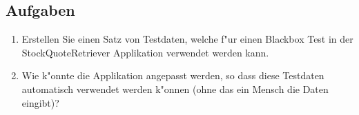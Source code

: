 \subsection{Aufgaben}
\begin{enumerate}
\item Erstellen Sie einen Satz von Testdaten, welche f"ur einen Blackbox Test in der
StockQuoteRetriever Applikation verwendet werden kann.
\item Wie k"onnte die Applikation angepasst werden, so dass diese Testdaten
automatisch verwendet werden k"onnen (ohne das ein Mensch die Daten eingibt)?
\end{enumerate}
\newpage

